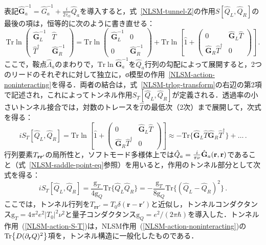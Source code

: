 \documentclass[a4paper,11pt]{ltjsarticle}
\def\Tr{\mathrm{Tr}}
\def\tauel{\tau_{\mathrm{el}}}
\begin{document}
表記$\hat{\mathbf{G}}^{-1}_{a}=\hat{G}^{-1}_a +
\frac{i}{2\tauel}\hat{Q}_{a}$を導入すると，式~\eqref{NLSM-tunnel-Z}の作用$S[\hat{Q}_{L},\hat{Q}_{R}]$の最後の項は，恒等的に次のように書き直せる：
\begin{equation}\label{NLSM-trlog-transform}
\Tr\ln\left(\begin{array}{cc}
\hat{\mathbf{G}}^{-1}_{L} & \hat{T} \\
\hat{T}^{\dag} & \hat{\mathbf{G}}^{-1}_{R}
\end{array}\right)=\Tr\ln\left(\begin{array}{cc}
\hat{\mathbf{G}}^{-1}_{L} & 0 \\
0 & \hat{\mathbf{G}}^{-1}_{R}\end{array}\right)
+\Tr\ln\left[\hat 1+\left(\begin{array}{cc}
0 & \hat{\mathbf{G}}_{L}\hat{T} \\
\hat{\mathbf{G}}_{R}\hat{T}^{\dag} & 0
\end{array}\right)\right]\,.
\end{equation}
ここで，鞍点$\hat{\Lambda}_{a}$のまわりで，$\Tr\ln\hat{\mathbf{G}}^{-1}_{a}$を$\hat{Q}_{a}$行列の勾配によって展開すると，2つのリードのそれぞれに対して独立に，σ模型の作用~\eqref{NLSM-action-noninteracting}を得る．両者の結合は，式~\eqref{NLSM-trlog-transform}の右辺の第2項で記述され，これによってトンネル作用$S_{T}[\hat{Q}_{L},\hat{Q}_{R}]$が定義される．透過率の小さいトンネル接合では，対数のトレースを$\hat{T}$の最低次（2次）まで展開して，次式を得る：
\begin{equation}\label{NLSM-action-S-T-log-expansion}
iS_{T}[\hat Q_{L},\hat Q_{R}]=\Tr\ln\left[\hat 1+\left(\begin{array}{cc}
0 & \hat{\mathbf{G}}_{L}\hat{T} \\
\hat{\mathbf{G}}_{R}\hat{T}^{\dag} & 0
\end{array}\right)\right]
\approx-\Tr\big\{\hat{\mathbf{G}}_{L}\hat{T}\hat{\mathbf{G}}_{R}\hat{T}^{\dag}\big\}+\ldots\,.
\end{equation}
行列要素$T_{{\bf r r}'}$の局所性と，ソフトモード多様体上では$\hat{Q}_{a}=\frac{i}{\pi\nu}\hat{\mathbf{G}}_{a}({\bf r},{\bf r})$であること（式~\eqref{NLSM-saddle-point-eq}参照）を用いると，作用のトンネル部分として次式を得る：
\begin{equation}\label{NLSM-action-S-T}
iS_{T}[\hat Q_{L},\hat Q_{R}]=\frac{
\mathrm{g}_{T}}{4\mathrm{g}_{Q}}\Tr\big\{\hat{Q}_{L}\hat{Q}_{R}\big\}
= - \frac{\mathrm{g}_{T}}{8\mathrm{g}_{Q}}
\Tr\big\{(\hat{Q}_{L} - \hat{Q}_{R})^2 \big\}\,.
\end{equation}
ここでは，トンネル行列を$T_{\mathbf{rr}'}=T_{0}\delta(\mathbf{r}-\mathbf{r}')$と近似し，トンネルコンダクタンス$\mathrm{g}_{T}=4\pi^2
e^{2}|T_{0}|^{2}\nu^2$と量子コンダクタンス$\mathrm{g}_Q=e^2/(2\pi \hbar )$を導入した．トンネル作用~(\ref{NLSM-action-S-T})は，NLSM作用~(\ref{NLSM-action-noninteracting})の$\Tr\big\{D(\partial_{\bf r} Q)^2\big\}$項を，トンネル構造に一般化したものである．
\end{document}
